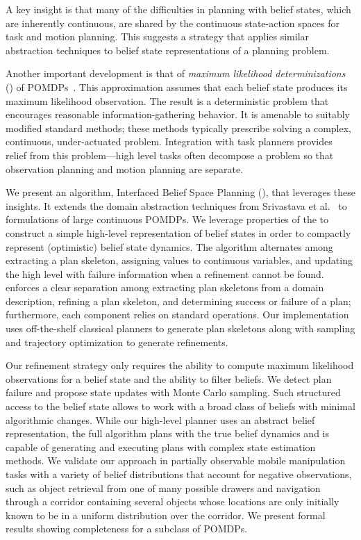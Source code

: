A key insight is that many of the difficulties in planning with belief
states, which are inherently continuous, are shared by the continuous
state-action spaces for task and motion planning. This suggests a
strategy that applies similar abstraction techniques to belief state
representations of a planning problem.

Another important development is that of \emph{maximum likelihood
  determinizations} (\mld) of POMDPs~\cite{platt2010belief}. This
approximation assumes that each belief state produces its maximum
likelihood observation. The result is a deterministic problem that
encourages reasonable information-gathering behavior. It is amenable
to suitably modified standard methods; these methods typically
prescribe solving a complex, continuous, under-actuated
problem. Integration with task planners provides relief from this
problem---high level tasks often decompose a problem so that
observation planning and motion planning are separate.

We present an algorithm, Interfaced Belief Space Planning (\ibsp),
that leverages these insights. It extends the domain abstraction
techniques from Srivastava et al.~\cite{srivastava2014combined} to
\mld{} formulations of large continuous POMDPs. We leverage properties
of the \mld{} to construct a simple high-level representation of belief
states in order to compactly represent (optimistic) belief state dynamics. The algorithm alternates among extracting a plan
skeleton, assigning values to continuous variables, and updating the
high level with failure information when a refinement cannot be found.
\ibsp{} enforces a clear separation among extracting plan skeletons
from a domain description, refining a plan skeleton, and determining
success or failure of a plan; furthermore, each component relies on
standard operations. Our implementation uses off-the-shelf classical
planners to generate plan skeletons along with sampling and trajectory
optimization to generate refinements.

Our refinement strategy only requires the ability to compute maximum
likelihood observations for a belief state and the ability to filter
beliefs. We detect plan failure and propose state updates with Monte Carlo
sampling. Such structured access to the belief state allows \ibsp{} to work with a broad class
of beliefs with minimal algorithmic changes. While our high-level
planner uses an abstract belief representation, the full algorithm
plans with the true belief dynamics and is capable of generating and executing plans
with complex state estimation methods. We validate our approach in
partially observable mobile manipulation tasks with a variety of
belief distributions that account for negative observations, such as object retrieval from
one of many possible drawers and navigation through a corridor containing several objects
whose locations are only initially known to be in a uniform distribution over the corridor. We
present formal results showing completeness for a subclass of POMDPs.

